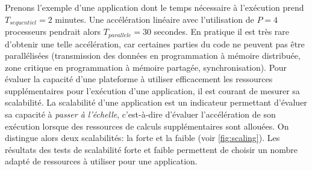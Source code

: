        Prenons l'exemple d'une application dont le temps nécessaire à l'exécution prend  $T_{sequentiel} = 2$ minutes. Une accélération linéaire avec l'utilisation de $P = 4$ processeurs pendrait alors $T_{parallele} = 30$ secondes. En pratique il est très rare d'obtenir une telle accélération, car certaines parties du code ne peuvent pas être parallélisées (transmission des données en programmation à mémoire distribuée, zone critique en programmation à mémoire partagée, synchronisation). 
        Pour évaluer la capacité d'une plateforme à utiliser efficacement les ressources supplémentaires pour l'exécution d'une application, il est courant de mesurer sa scalabilité. La scalabilité d'une application est un indicateur permettant d'évaluer sa capacité à \textit{passer à l'échelle}, c'est-à-dire d'évaluer l'accélération de son exécution lorsque des ressources de calculs supplémentaires sont allouées. On distingue alors deux scalabilités: la forte et la faible (voir \autoref{fig:scaling}). Les résultats des tests de scalabilité forte et faible permettent de choisir un nombre adapté de ressources à utiliser pour une application.
        
